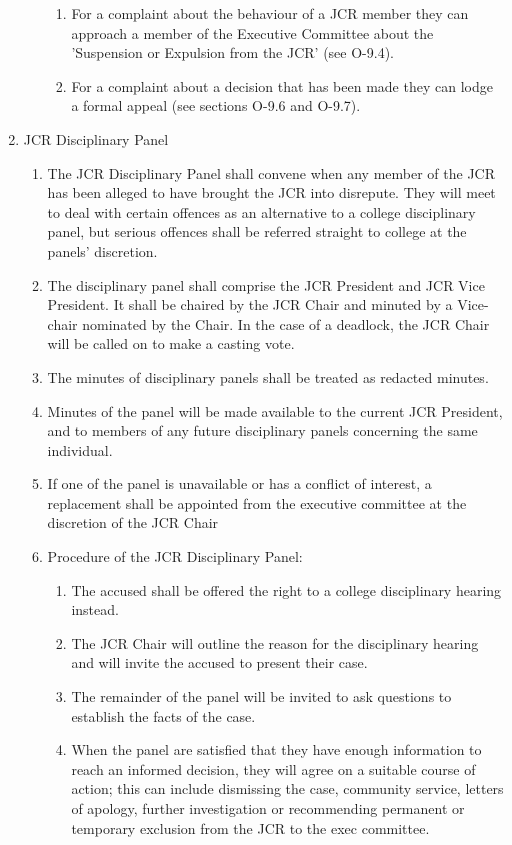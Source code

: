 \begin{enumerate}
\begin{enumerate}
\begin{enumerate}
            \item For a complaint about the behaviour of a JCR member they can approach a member of the Executive Committee about the 'Suspension or Expulsion from the JCR' (see O-9.4).
            \item For a complaint about a decision that has been made they can lodge a formal appeal (see sections O-9.6 and O-9.7).
        \end{enumerate}
    \end{enumerate}
    \item JCR Disciplinary Panel
    \begin{enumerate}
        \item The JCR Disciplinary Panel shall convene when any member of the JCR has been alleged to have brought the JCR into disrepute. They will meet to deal with certain offences as an alternative to a college disciplinary panel, but serious offences shall be referred straight to college at the panels’ discretion.
        \item The disciplinary panel shall comprise the JCR President and JCR Vice President. It shall be chaired by the JCR Chair and minuted by a Vice-chair nominated by the Chair. In the case of a deadlock, the JCR Chair will be called on to make a casting vote.
        \item The minutes of disciplinary panels shall be treated as redacted minutes.
        \item Minutes of the panel will be made available to the current JCR President, and to members of any future disciplinary panels concerning the same individual.
        \item If one of the panel is unavailable or has a conflict of interest, a replacement shall be appointed from the executive committee at the discretion of the JCR Chair
        \item Procedure of the JCR Disciplinary Panel:
        \begin{enumerate}
            \item The accused shall be offered the right to a college disciplinary hearing instead.
            \item The JCR Chair will outline the reason for the disciplinary hearing and will invite the accused to present their case.
            \item The remainder of the panel will be invited to ask questions to establish the facts of the case.
            \item When the panel are satisfied that they have enough information to reach an informed decision, they will agree on a suitable course of action; this can include dismissing the case, community service, letters of apology, further investigation or recommending permanent or temporary exclusion from the JCR to the exec committee.

\end{enumerate}
\end{enumerate}
\end{enumerate}

